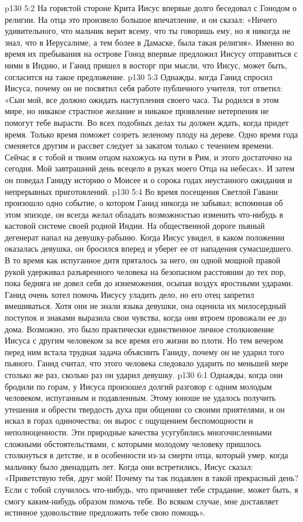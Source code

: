 \vs p130 5:2 На гористой стороне Крита Иисус впервые долго беседовал с Гонодом о религии. На отца это произвело большое впечатление, и он сказал: «Ничего удивительного, что мальчик верит всему, что ты говоришь ему, но я никогда не знал, что в Иерусалиме, а тем более в Дамаске, была такая религия». Именно во время их пребывания на острове Гонод впервые предложил Иисусу отправиться с ними в Индию, и Ганид пришел в восторг при мысли, что Иисус, может быть, согласится на такое предложение.
\vs p130 5:3 Однажды, когда Ганид спросил Иисуса, почему он не посвятил себя работе публичного учителя, тот ответил: «Сын мой, все должно ожидать наступления своего часа. Ты родился в этом мире, но никакое страстное желание и никакое проявление нетерпения не помогут тебе вырасти. Во всех подобных делах ты должен ждать, когда придет время. Только время поможет созреть зеленому плоду на дереве. Одно время года сменяется другим и рассвет следует за закатом только с течением времени. Сейчас я с тобой и твоим отцом нахожусь на пути в Рим, и этого достаточно на сегодня. Мой завтрашний день всецело в руках моего Отца на небесах». И затем он поведал Ганиду историю о Моисее и о сорока годах неустанного ожидания и непрерывных приготовлений.
\vs p130 5:4 Во время посещения Светлой Гавани произошло одно событие, о котором Ганид никогда не забывал; вспоминая об этом эпизоде, он всегда желал обладать возможностью изменить что\hyp{}нибудь в кастовой системе своей родной Индии. На общественной дороге пьяный дегенерат напал на девушку\hyp{}рабыню. Когда Иисус увидел, в каком положении оказалась девушка, он бросился вперед и уберег ее от нападения сумасшедшего. В то время как испуганное дитя пряталось за него, он одной мощной правой рукой удерживал разъяренного человека на безопасном расстоянии до тех пор, пока бедняга не довел себя до изнеможения, осыпая воздух яростными ударами. Ганид очень хотел помочь Иисусу уладить дело, но его отец запретил вмешиваться. Хотя они не знали языка девушки, она оценила их милосердный поступок и знаками выразила свои чувства, когда они втроем провожали ее до дома. Возможно, это было практически единственное личное столкновение Иисуса с другим человеком за все время его жизни во плоти. Но тем вечером перед ним встала трудная задача объяснить Ганиду, почему он не ударил того пьяного. Ганид считал, что этого человека следовало ударить по меньшей мере столько же раз, сколько раз он ударил девушку.
\vs p130 6:1 Однажды, когда они бродили по горам, у Иисуса произошел долгий разговор с одним молодым человеком, испуганным и подавленным. Этому юноше не удалось получить утешения и обрести твердость духа при общении со своими приятелями, и он искал в горах одиночества; он вырос с ощущением беспомощности и неполноценности. Эти природные качества усугубились многочисленными сложными обстоятельствами, с которыми молодому человеку пришлось столкнуться в детстве, и в особенности из\hyp{}за смерти отца, который умер, когда мальчику было двенадцать лет. Когда они встретились, Иисус сказал: «Приветствую тебя, друг мой! Почему ты так подавлен в такой прекрасный день? Если с тобой случилось что\hyp{}нибудь, что причиняет тебе страдание, может быть, я смогу каким\hyp{}нибудь образом помочь тебе. Во всяком случае, мне доставляет истинное удовольствие предложить тебе свою помощь».
